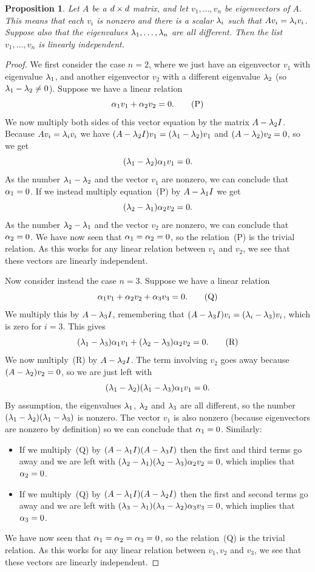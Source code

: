 \documentclass[reqno]{amsart}
\newtheorem{proposition}[theorem]{Proposition}
\theoremstyle{definition}
\begin{document}
\begin{proposition}\label{prop-independent-eigenvectors}
 Let $A$ be a $d\times d$ matrix, and let $v_1,\dotsc,v_n$ be
 eigenvectors of $A$.  This means that each $v_i$ is nonzero and there
 is a scalar $\lambda_i$ such that $Av_i=\lambda_iv_i$.  Suppose also that the
 eigenvalues $\lambda_1,\dotsc,\lambda_n$ are all different.  Then the list
 $v_1,\dotsc,v_n$ is linearly independent.
\end{proposition}
\begin{proof}
 We first consider the case $n=2$, where we just have an eigenvector
 $v_1$ with eigenvalue $\lambda_1$, and another eigenvector $v_2$ with
 a different eigenvalue $\lambda_2$ (so $\lambda_1-\lambda_2\neq 0$).  Suppose we
 have a linear relation
 \[ \alpha_1v_1 + \alpha_2v_2 = 0. \tag{P} \]
 We now multiply both sides of this vector equation by the matrix
 $A-\lambda_2I$.  Because $Av_i=\lambda_iv_i$ we have
 $(A-\lambda_2I)v_1=(\lambda_1-\lambda_2)v_1$ and $(A-\lambda_2)v_2=0$, so we get
 \[ (\lambda_1-\lambda_2)\alpha_1 v_1 = 0. \]
 As the number $\lambda_1-\lambda_2$ and the vector $v_1$ are nonzero, we can
 conclude that $\alpha_1=0$.  If we instead multiply equation~(P) by
 $A-\lambda_1I$ we get
 \[ (\lambda_2-\lambda_1)\alpha_2v_2 = 0. \]
 As the number $\lambda_2-\lambda_1$ and the vector $v_2$ are nonzero, we can
 conclude that $\alpha_2=0$.  We have now seen that $\alpha_1=\alpha_2=0$, so
 the relation~(P) is the trivial relation.  As this works for any
 linear relation between $v_1$ and $v_2$, we see that these vectors
 are linearly independent.

 Now consider instead the case $n=3$.  Suppose we have a linear
 relation
 \[ \alpha_1v_1 + \alpha_2v_2 + \alpha_3v_3 = 0. \tag{Q} \]
 We multiply this by $A-\lambda_3I$, remembering that
 $(A-\lambda_3I)v_i=(\lambda_i-\lambda_3)v_i$, which is zero for $i=3$.  This
 gives
 \[ (\lambda_1-\lambda_3)\alpha_1v_1 + (\lambda_2-\lambda_3)\alpha_2v_2 = 0. \tag{R} \]
 We now multiply~(R) by $A-\lambda_2I$.  The term involving $v_2$ goes
 away because $(A-\lambda_2)v_2=0$, so we are just left with
 \[ (\lambda_1-\lambda_2)(\lambda_1-\lambda_3)\alpha_1v_1 = 0. \]
 By assumption, the eigenvalues $\lambda_1$, $\lambda_2$ and $\lambda_3$ are all
 different, so the number $(\lambda_1-\lambda_2)(\lambda_1-\lambda_3)$ is nonzero.
 The vector $v_1$ is also nonzero (because eigenvectors are nonzero by
 definition) so we can conclude that $\alpha_1=0$.  Similarly:
 \begin{itemize}
  \item If we multiply~(Q) by $(A-\lambda_1I)(A-\lambda_3I)$ then the first
   and third terms go away and we are left with
   $(\lambda_2-\lambda_1)(\lambda_2-\lambda_3)\alpha_2v_2=0$, which implies that
   $\alpha_2=0$.
  \item If we multiply~(Q) by $(A-\lambda_1I)(A-\lambda_2I)$ then the first
   and second terms go away and we are left with
   $(\lambda_3-\lambda_1)(\lambda_3-\lambda_2)\alpha_3v_3=0$, which implies that
   $\alpha_3=0$.
 \end{itemize}
 We have now seen that $\alpha_1=\alpha_2=\alpha_3=0$, so
 the relation~(Q) is the trivial relation.  As this works for any
 linear relation between $v_1,v_2$ and $v_3$, we see that these
 vectors are linearly independent.


\end{proof}
\end{document}
